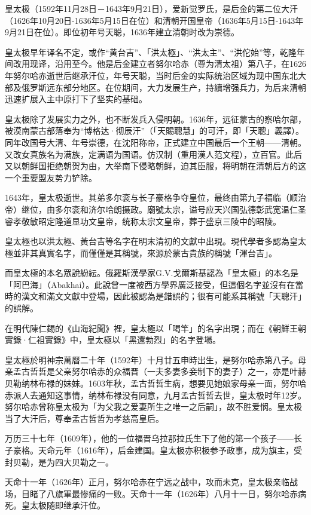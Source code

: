 皇太极（1592年11月28日－1643年9月21日），爱新觉罗氏，是后金的第二位大汗（1626年10月20日-1636年5月15日在位）和清朝开国皇帝（1636年5月15日-1643年9月21日在位）。即位初年号天聪，1636年建立清朝时改为崇德。

皇太极早年译名不定，或作“黄台吉”、「洪太極」、“洪太主”、“洪佗始”等，乾隆年间改用现译，沿用至今。他是后金建立者努尔哈赤（尊为清太祖）第八子，在1626年努尔哈赤逝世后继承汗位，年号天聪，当时后金的实际统治区域为现中国东北大部及俄罗斯远东部分地区。在位期间，大力发展生产，持續增强兵力，为后来清朝迅速扩展入主中原打下了坚实的基础。

皇太极除了发展实力之外，也不断发兵入侵明朝。1636年，远征蒙古的察哈尔部，被漠南蒙古部落奉为“博格达·彻辰汗”（「天賜聰慧」的可汗，即「天聰」義譯）。同年改国号大清、年号崇德，在沈阳称帝，正式建立中国最后一个王朝——清朝。又改女真族名为满族，定满语为国语。仿汉制（重用漢人范文程），立百官。此后又以朝鲜国拒绝朝贺为由，大举南下侵略朝鲜，迫其臣服，将明朝在清朝后方的这一个重要盟友势力铲除。

1643年，皇太极逝世。其弟多尔衮与长子豪格争夺皇位，最终由第九子福临（顺治帝）继位，由多尔衮和济尔哈朗摄政。廟號太宗，谥号应天兴国弘德彰武宽温仁圣睿孝敬敏昭定隆道显功文皇帝，统称太宗文皇帝，葬于盛京三陵中的昭陵。

皇太極也以洪太極、黃台吉等名字在明末清初的文獻中出現。現代學者多認為皇太極並非其真實名字，而僅僅是其稱號，來源於蒙古貴族的稱號「渾台吉」。

而皇太極的本名眾說紛紜。俄羅斯漢學家G.V.戈爾斯基認為「皇太極」的本名是「阿巴海」（Abakhai）。此說曾一度被西方學界廣泛接受，但這個名字並沒有在當時的漢文和滿文文獻中登場，因此被認為是錯誤的；很有可能系其稱號「天聰汗」的誤解。

在明代陳仁錫的《山海紀聞》裡，皇太極以「喝竿」的名字出現；而在《朝鮮王朝實錄·仁祖實錄》中，皇太極以「黑還勃烈」的名字登場。

皇太極於明神宗萬曆二十年（1592年）十月廿五申時出生，是努尔哈赤第八子。母亲孟古哲哲是父亲努尔哈赤的众福晋（一夫多妻多妾制下的妻子）之一，亦是叶赫贝勒纳林布禄的妹妹。1603年秋，孟古哲哲生病，想要见她娘家母亲一面，努尔哈赤派人去通知这事情，纳林布禄没有同意，九月孟古哲哲去世，皇太极时年12岁。努尔哈赤曾称皇太极为「为父我之爱妻所生之唯一之后嗣」，故不胜爱悯。皇太极当了大汗后，尊奉孟古哲哲为孝慈高皇后。

万历三十七年（1609年），他的一位福晋乌拉那拉氏生下了他的第一个孩子——长子豪格。天命元年（1616年），后金建国。皇太极亦积极参予政事，成为旗主，受封贝勒，是为四大贝勒之一。

天命十一年（1626年）正月，努尔哈赤在宁远之战中，攻而未克，皇太极亲临战场，目睹了八旗軍最惨痛的一败。天命十一年（1626年）八月十一日，努尔哈赤病死。皇太极随即继承汗位。

